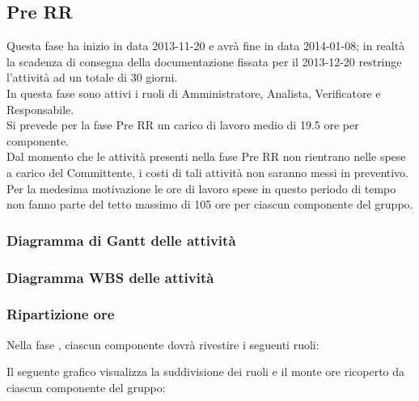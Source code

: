 \subsection{Pre RR}
Questa fase ha inizio in data 2013-11-20 e avrà fine in data 2014-01-08; in realtà la scadenza di consegna della documentazione fissata per il 2013-12-20 restringe l'attività ad un totale di 30 giorni.\\
In questa fase sono attivi i ruoli di Amministratore, Analista, Verificatore e Responsabile.\\
Si prevede per la fase Pre RR un carico di lavoro medio di 19.5 ore per componente.\\
Dal momento che le attività presenti nella fase Pre RR non rientrano nelle spese a carico del Committente, i costi di tali attività non saranno messi in preventivo.\\
Per la medesima motivazione le ore di lavoro spese in questo periodo di tempo non fanno parte del tetto massimo di 105 ore per ciascun componente del gruppo.

\subsubsection{Diagramma di Gantt delle attività}

\newpage
\subsubsection{Diagramma WBS delle attività}

\newpage
\subsubsection{Ripartizione ore}

\newpage
Nella fase , ciascun componente dovrà rivestire i seguenti ruoli:

Il seguente grafico visualizza la suddivisione dei ruoli e il monte ore ricoperto da ciascun componente del gruppo:
